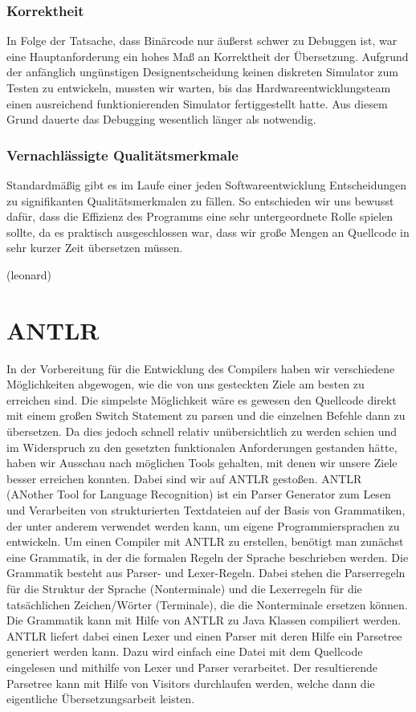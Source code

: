 \documentclass[paper=a4,fontsize=12pt,twocolumn]{scrreprt}
\begin{document}
\subsubsection{Korrektheit}
In Folge der Tatsache, dass Binärcode nur äußerst schwer zu Debuggen ist, war eine Hauptanforderung ein hohes Maß an Korrektheit der Übersetzung.
Aufgrund der anfänglich ungünstigen Designentscheidung keinen diskreten Simulator zum Testen zu entwickeln, mussten wir warten, bis das Hardwareentwicklungsteam einen ausreichend funktionierenden Simulator fertiggestellt hatte.
Aus diesem Grund dauerte das Debugging wesentlich länger als notwendig.

\subsubsection{Vernachlässigte Qualitätsmerkmale}
Standardmäßig gibt es im Laufe einer jeden Softwareentwicklung Entscheidungen zu signifikanten Qualitätsmerkmalen zu fällen.
So entschieden wir uns bewusst dafür, dass die Effizienz des Programms eine sehr untergeordnete Rolle spielen sollte, da es praktisch ausgeschlossen war, dass wir große Mengen an Quellcode in sehr kurzer Zeit übersetzen müssen.

(leonard)

\section{ANTLR}
In der Vorbereitung für die Entwicklung des Compilers haben wir verschiedene Möglichkeiten abgewogen, wie die von uns gesteckten Ziele am besten zu erreichen sind.
Die simpelste Möglichkeit wäre es gewesen den Quellcode direkt mit einem großen Switch Statement zu parsen und die einzelnen Befehle dann zu übersetzen.
Da dies jedoch schnell relativ unübersichtlich zu werden schien und im Widerspruch zu den gesetzten funktionalen Anforderungen gestanden hätte, haben wir Ausschau nach möglichen Tools gehalten, mit denen wir unsere Ziele besser erreichen konnten.
Dabei sind wir auf ANTLR gestoßen.
ANTLR (ANother Tool for Language Recognition) ist ein Parser Generator zum Lesen und Verarbeiten von strukturierten Textdateien auf der Basis von Grammatiken, der unter anderem verwendet werden kann, um eigene Programmiersprachen zu entwickeln.
Um einen Compiler mit ANTLR zu erstellen, benötigt man zunächst eine Grammatik, in der die formalen Regeln der Sprache beschrieben werden.
Die Grammatik besteht aus Parser- und Lexer-Regeln.
Dabei stehen die Parserregeln für die Struktur der Sprache (Nonterminale) und die Lexerregeln für die tatsächlichen Zeichen/Wörter (Terminale), die die Nonterminale ersetzen können.
Die Grammatik kann mit Hilfe von ANTLR zu Java Klassen compiliert werden.
ANTLR liefert dabei einen Lexer und einen Parser mit deren Hilfe ein Parsetree generiert werden kann.
Dazu wird einfach eine Datei mit dem Quellcode eingelesen und mithilfe von Lexer und Parser verarbeitet.
Der resultierende Parsetree kann mit Hilfe von Visitors durchlaufen werden,
welche dann die eigentliche Übersetzungsarbeit leisten.
\end{document}
